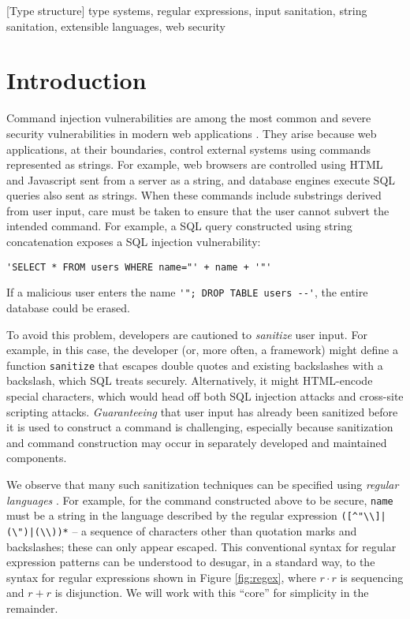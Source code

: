 \documentclass[10pt]{sigplanconf}
\theoremstyle{definition}
\begin{document}
[Type structure]
\keywords
type systems, regular expressions, input sanitation, string sanitation, extensible languages, web security

\section{Introduction}\label{intro}
Command injection vulnerabilities are among the most common and severe security vulnerabilities in modern web applications \cite{OWASP}. They arise because web applications, at their boundaries, control external systems using commands represented as  strings. For example, web browsers are controlled using HTML and Javascript sent from a server as a string, and database engines execute SQL queries also sent as strings. When these commands include substrings derived from user input, care must be taken to ensure that the user cannot  subvert the intended command. For example, a  SQL query constructed using string concatenation exposes a SQL injection vulnerability: 
\begin{lstlisting}[numbers=none]
'SELECT * FROM users WHERE name="' + name + '"'
\end{lstlisting}\vspace{-3px}
If a malicious user enters the name \lstinline{'"; DROP TABLE users --'}, the entire database could be erased. 

To avoid this problem, developers are cautioned to \emph{sanitize} user input. For example, in this case, the developer (or, more often, a framework) might define a function \verb|sanitize| that escapes double quotes and existing backslashes   with a backslash, which SQL treats securely. Alternatively, it might HTML-encode special characters, which would head off both SQL injection attacks and cross-site scripting attacks. \emph{Guaranteeing} that user input has already been sanitized  before it is used to construct a command is challenging, especially because  sanitization and command construction may occur in separately developed and maintained components. %

We observe that many such sanitization techniques can be specified using \emph{regular languages} \cite{cinderella}. For example, for the command constructed above to be secure, \verb|name| must be a string in the language described by the regular expression \verb!([^"\\]|(\")|(\\))*! -- a sequence of characters other than quotation marks and backslashes; these can only appear escaped. This conventional syntax for regular expression patterns can be understood to desugar, in a standard way, to the syntax for regular expressions shown in Figure \ref{fig:regex}, where $r \cdot r$ is sequencing and $r + r$ is  disjunction. We will work with this ``core'' for simplicity in the remainder.
\end{document}
